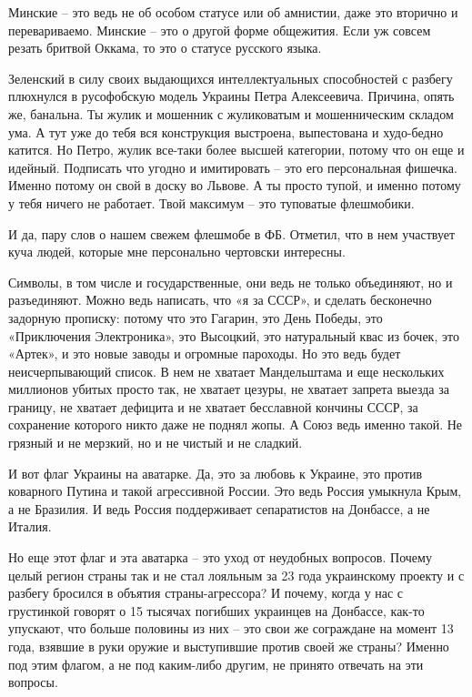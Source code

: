 Минские – это ведь не об особом статусе или об амнистии, даже это вторично и
перевариваемо. Минские – это о другой форме общежития. Если уж совсем резать
бритвой Оккама, то это о статусе русского языка.

Зеленский в силу своих выдающихся интеллектуальных способностей с разбегу
плюхнулся в русофобскую модель Украины Петра Алексеевича. Причина, опять же,
банальна. Ты жулик и мошенник с жуликоватым и мошенническим складом ума. А тут
уже до тебя вся конструкция выстроена, выпестована и худо-бедно катится. Но
Петро, жулик все-таки более высшей категории, потому что он еще и идейный.
Подписать что угодно и имитировать – это его персональная фишечка. Именно
потому он свой в доску во Львове. А ты просто тупой, и именно потому у тебя
ничего не работает. Твой максимум – это туповатые флешмобики.

И да, пару слов о нашем свежем флешмобе в ФБ. Отметил, что в нем участвует куча
людей, которые мне персонально чертовски интересны.

Символы, в том числе и государственные, они ведь не только объединяют, но и
разъединяют. Можно ведь написать, что «я за СССР», и сделать бесконечно
задорную прописку: потому что это Гагарин, это День Победы, это «Приключения
Электроника», это Высоцкий, это натуральный квас из бочек, это «Артек», и это
новые заводы и огромные пароходы. Но это ведь будет неисчерпывающий список. В
нем не хватает Мандельштама и еще нескольких миллионов убитых просто так, не
хватает цезуры, не хватает запрета выезда за границу, не хватает дефицита и не
хватает бесславной кончины СССР, за сохранение которого никто даже не поднял
жопы. А Союз ведь именно такой. Не грязный и не мерзкий, но и не чистый и не
сладкий.

И вот флаг Украины на аватарке. Да, это за любовь к Украине, это против
коварного Путина и такой агрессивной России. Это ведь Россия умыкнула Крым, а
не Бразилия. И ведь Россия поддерживает сепаратистов на Донбассе, а не Италия.

Но еще этот флаг и эта аватарка – это уход от неудобных вопросов. Почему целый
регион страны так и не стал лояльным за 23 года украинскому проекту и с разбегу
бросился в объятия страны-агрессора? И почему, когда у нас с грустинкой говорят
о 15 тысячах погибших украинцев на Донбассе, как-то упускают, что больше
половины из них – это свои же сограждане на момент 13 года, взявшие в руки
оружие и выступившие против своей же страны? Именно под этим флагом, а не под
каким-либо другим, не принято отвечать на эти вопросы.

